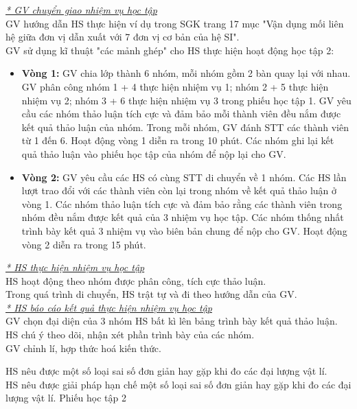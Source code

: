 {\textit{\underline{* GV chuyển giao nhiệm vụ học tập}}\\
	GV hướng dẫn HS thực hiện ví dụ trong SGK trang 17 mục "Vận dụng mối liên hệ giữa đơn vị dẫn xuất với 7 đơn vị cơ bản của hệ SI".\\
	GV sử dụng kĩ thuật "các mảnh ghép" cho HS thực hiện hoạt động học tập 2:
	\begin{itemize}
		\item \textbf{Vòng 1:} GV chia lớp thành 6 nhóm, mỗi nhóm gồm  2 bàn quay lại với nhau. GV phân công nhóm 1 + 4 thực hiện nhiệm vụ 1; nhóm 2 + 5 thực hiện nhiệm vụ 2; nhóm 3 + 6 thực hiện nhiệm vụ 3 trong phiếu học tập 1. GV yêu cầu các nhóm thảo luận tích cực và đảm bảo mỗi thành viên đều nắm được kết quả thảo luận của nhóm. Trong mỗi nhóm, GV đánh STT các thành viên từ 1 đến 6. Hoạt động vòng 1 diễn ra trong 10 phút. Các nhóm ghi lại kết quả thảo luận vào phiếu học tập của nhóm để nộp lại cho GV.
		\item \textbf{Vòng 2:} GV yêu cầu các HS có cùng STT di chuyển về 1 nhóm. Các HS lần lượt trao đổi với các thành viên còn lại trong nhóm về kết quả thảo luận ở vòng 1. Các nhóm thảo luận tích cực và đảm bảo rằng các thành viên trong nhóm đều nắm được kết quả của 3 nhiệm vụ học tập. Các nhóm thống nhất trình bày kết quả 3 nhiệm vụ vào biên bản chung để nộp cho GV. Hoạt động vòng 2 diễn ra trong 15 phút.
	\end{itemize}
\textit{\underline{* HS thực hiện nhiệm vụ học tập}}\\
HS hoạt động theo nhóm được phân công, tích cực thảo luận.\\
Trong quá trình di chuyển, HS trật tự và đi theo hướng dẫn của GV.\\
\textit{\underline{* HS báo cáo kết quả thực hiện nhiệm vụ học tập}}\\
GV chọn đại diện của 3 nhóm HS bất kì lên bảng trình bày kết quả thảo luận.\\
HS chú ý theo dõi, nhận xét phần trình bày của các nhóm.\\
GV chỉnh lí, hợp thức hoá kiến thức.

}
{
	HS nêu được một số loại sai số đơn giản hay gặp khi đo các đại lượng vật lí.\\
	HS nêu được giải pháp hạn chế một số loại sai số đơn giản hay gặp khi đo các đại lượng vật lí.
}
{
Phiếu học tập 2
}

